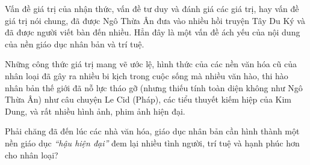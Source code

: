 Vấn đề giá trị của nhận thức, vấn đề tư duy và đánh giá các giá trị, hay vấn đề giá trị nói chung, đã được Ngô Thừa Ân đưa vào nhiều hồi truyện Tây Du Ký và đã được người viết bàn đến nhiều. Hẳn đây là một vấn đề ách yếu của nội dung của nền giáo dục nhân bản và trí tuệ.

Những công thức giá trị mang vẽ ước lệ, hình thức của các nền văn hóa cũ của nhân loại đã gây ra nhiều bi kịch trong cuộc sống mà nhiều văn hào, thi hào nhân bản thế giới đã nỗ lực tháo gỡ (nhưng thiếu tính toàn diện không như Ngô Thừa Ân) như câu chuyện Le Cid (Pháp), các tiểu thuyết kiếm hiệp của Kim Dung, và rất nhiều hình ảnh, phim ảnh hiện đại.

Phải chăng đã đến lúc các nhà văn hóa, giáo dục nhân bản cần hình thành một nền giáo dục \emph{``hậu hiện đại''} đem lại nhiều tình người, trí tuệ và hạnh phúc hơn cho nhân loại?
